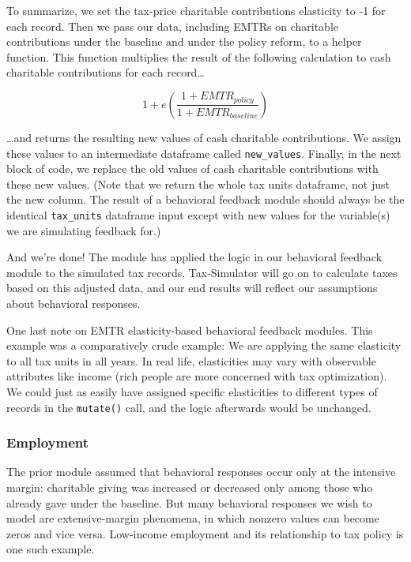 \documentclass[
]{article}
\begin{document}
To summarize, we set the tax-price charitable contributions elasticity
to -1 for each record. Then we pass our data, including EMTRs on
charitable contributions under the baseline and under the policy reform,
to a helper function. This function multiplies the result of the
following calculation to cash charitable contributions for each
record\ldots{}

\[
1+e \left( \frac{1+EMTR_{policy}}{1+EMTR_{baseline}} \right)
\]

\ldots and returns the resulting new values of cash charitable
contributions. We assign these values to an intermediate dataframe
called \texttt{new\_values}. Finally, in the next block of code, we
replace the old values of cash charitable contributions with these new
values. (Note that we return the whole tax units dataframe, not just the
new column. The result of a behavioral feedback module should always be
the identical \texttt{tax\_units} dataframe input except with new values
for the variable(s) we are simulating feedback for.)

And we're done! The module has applied the logic in our behavioral
feedback module to the simulated tax records. Tax-Simulator will go on
to calculate taxes based on this adjusted data, and our end results will
reflect our assumptions about behavioral responses.

One last note on EMTR elasticity-based behavioral feedback modules. This
example was a comparatively crude example: We are applying the same
elasticity to all tax units in all years. In real life, elasticities may
vary with observable attributes like income (rich people are more
concerned with tax optimization). We could just as easily have assigned
specific elasticities to different types of records in the
\texttt{mutate()} call, and the logic afterwards would be unchanged.

\hypertarget{employment}{%
\subsubsection{Employment}\label{employment}}

The prior module assumed that behavioral responses occur only at the
intensive margin: charitable giving was increased or decreased only
among those who already gave under the baseline. But many behavioral
responses we wish to model are extensive-margin phenomena, in which
nonzero values can become zeros and vice versa. Low-income employment
and its relationship to tax policy is one such example.
\end{document}

